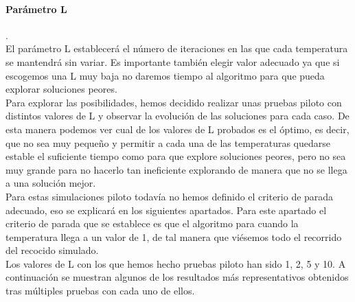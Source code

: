 \documentclass[a4paper,12pt]{article}
\begin{document}
	\paragraph{Parámetro L}.\\
	El parámetro L establecerá el número de iteraciones en las que cada temperatura se mantendrá sin variar. Es importante también elegir valor adecuado ya que si escogemos una L muy baja no daremos tiempo al algoritmo para que pueda explorar soluciones peores.\\

	Para explorar las posibilidades, hemos decidido realizar unas pruebas piloto con distintos valores de L y observar la evolución de las soluciones para cada caso. De esta manera podemos ver cual de los valores de L probados es el óptimo, es decir, que no sea muy pequeño y permitir a cada una de las temperaturas quedarse estable el suficiente tiempo como para que explore soluciones peores, pero no sea muy grande para no hacerlo tan ineficiente explorando de manera que no se llega a una solución mejor.\\

	Para estas simulaciones piloto todavía no hemos definido el criterio de parada adecuado, eso se explicará en los siguientes apartados. Para este apartado el criterio de parada que se establece es que el algoritmo para cuando la temperatura llega a un valor de 1, de tal manera que viésemos todo el recorrido del recocido simulado.\\

	Los valores de L con los que hemos hecho pruebas piloto han sido 1, 2, 5 y 10. A continuación se muestran algunos de los resultados más representativos obtenidos tras múltiples pruebas con cada uno de ellos.\\

	
	
\end{document}
